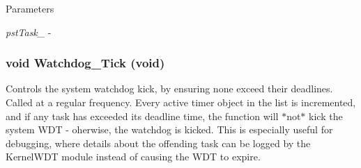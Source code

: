 \begin{DoxyParams}{Parameters}
\item[{\em pstTask\_\-}]-\/ \end{DoxyParams}
\subsubsection[{Watchdog\_\-Tick}]{\setlength{\rightskip}{0pt plus 5cm}void Watchdog\_\-Tick (void)}\label{watchdog_8h_a85a9918ed38b9f7cd62cc9224cf1b583}
Controls the system watchdog kick, by ensuring none exceed their deadlines. Called at a regular frequency. Every active timer object in the list is incremented, and if any task has exceeded its deadline time, the function will $\ast$not$\ast$ kick the system WDT -\/ oherwise, the watchdog is kicked. This is especially useful for debugging, where details about the offending task can be logged by the KernelWDT module instead of causing the WDT to expire. 